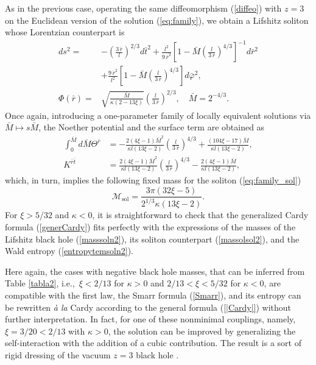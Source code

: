 \documentclass[prd,twocolumn,superscriptaddress,amsmath,amssymb,nofootinbib]{revtex4-1}
\begin{document}
As in the previous case, operating the same diffeomorphism
(\ref{diffeo}) with $z=3$ on the Euclidean version of the
solution (\ref{eq:family}), we obtain a Lifshitz soliton whose
Lorentzian counterpart is
\begin{subequations}\label{eq:family_sol}
\begin{align}
ds^2 ={}&
-\left(\frac{3\,\bar{r}}{l}\right)^{2/3} d\bar{t}^2
+\frac{l^2}{9\,\bar{r}^2}
\left[1-\bar{M}\left(\frac{l}{3\,\bar{r}}\right)^{4/3}\right]^{-1}d\bar{r}^2\nonumber\\
&+\frac{9\,\bar{r}^2}{l^2}
\left[1-\bar{M}\left(\frac{l}{3\,\bar{r}}\right)^{4/3}\right]d{\bar{\varphi}}^2,\\
\Phi(\bar{r})={}&\sqrt{\frac{\bar{M}}{\kappa(2-13\xi)}}
\left(\frac{l}{3\,\bar{r}}\right)^{2/3}, \quad \bar{M}=2^{-4/3}.
\end{align}
\end{subequations}
Once again, introducing a one-parameter family of locally
equivalent solutions via $\bar{M}{\mapsto}s\bar{M}$, the
Noether potential and the surface term are obtained as
\begin{align}
\int_{0}^{\bar{M}}\!\!\!\!d\bar{M}\Theta^{\bar{r}}&=
-\frac{2(4\xi-1)\bar{M}^2}{{\kappa}l(13\xi-2)}\!
\left(\frac{l}{3\,\bar{r}}\right)^{4/3}
+\frac{(104\xi-17)\bar{M}}{{\kappa}l(13\xi-2)},\nonumber\\
K^{\bar{r}\bar{t}}&=
\frac{2(4\xi-1)\bar{M}^2}{{\kappa}l(13\xi-2)}
\left(\frac{l}{3\,\bar{r}}\right)^{4/3}
-\frac{2(4\xi-1)\bar{M}}{{\kappa}l(13\xi-2)},\nonumber
\end{align}
which, in turn, implies the following fixed mass for the soliton
(\ref{eq:family_sol})
\begin{equation}\label{massolsol2}
\mathcal{M}_{\mathrm{sol}}=\frac{3\pi(32\xi-5)}{2^{1/3}\kappa(13\xi-2)}.
\end{equation}
For $\xi>5/32$ and $\kappa<0$, it is straightforward to check
that the generalized Cardy formula (\ref{generCardy}) fits
perfectly with the expressions of the masses of the Lifshitz
black hole (\ref{masssoln2}), its soliton counterpart
(\ref{massolsol2}), and the Wald entropy
(\ref{entropytemsoln2}).

Here again, the cases with negative black hole masses, that can
be inferred from Table \ref{tabla2}, i.e.,\ $\xi<2/13$ for
$\kappa>0$ and $2/13<\xi<5/32$ for $\kappa<0$, are compatible
with the first law, the Smarr formula (\ref{Smarr}), and its
entropy can be rewritten \emph{\`a la} Cardy according to the
general formula (\ref{|Cardy|}) without further interpretation.
In fact, for one of these nonminimal couplings, namely,
$\xi=3/20<2/13$ with $\kappa>0$, the solution can be improved
by generalizing the self-interaction with the addition of a
cubic contribution. The result is a sort of rigid dressing of
the vacuum $z=3$ black hole \cite{AyonBeato:2009nh}.
\end{document}
